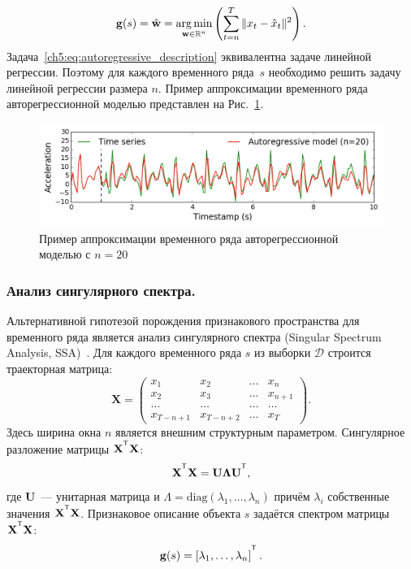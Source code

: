 \begin{equation}
\mathbf{g}(s) = \hat{\mathbf{w}} = \mathop{\arg \min}\limits_{\mathbf{w} \in \mathbb{R}^{n}} \left( \sum_{t=n}^{T} \|x_t - \hat{x}_t\|^2\right).
\label{ch5:eq:autoregressive_description}
\end{equation}
Задача~\eqref{ch5:eq:autoregressive_description} эквивалентна задаче линейной регрессии.
Поэтому для каждого временного ряда~$s$ необходимо решить задачу линейной регрессии размера $n$.
Пример аппроксимации временного ряда авторегрессионной моделью представлен на Рис.~\ref{ch5:fig:ar_example}.

\begin{figure}[ht]
	\centering
	\includegraphics[width=1\linewidth]{figs/ch5/ar_example.png}
	\caption{Пример аппроксимации временного ряда авторегрессионной моделью с $n = 20$}
	\label{ch5:fig:ar_example}
\end{figure}

\subsubsection{Анализ сингулярного спектра.}
Альтернативной гипотезой порождения признакового пространства для временного ряда является анализ сингулярного спектра (Singular Spectrum Analysis, SSA)~\cite{hassani2007singular}. 
Для каждого временного ряда $s$ из выборки $\mathcal{D}$ строится траекторная матрица:
\[
\mathbf{X} = 
\begin{pmatrix}
x_1 & x_2 & \dots & x_n \\
x_2 & x_3 & \dots & x_{n+1} \\
\dots & \dots & \dots & \dots \\
x_{T-n+1} & x_{T-n+2} & \dots & x_T
\end{pmatrix}.
\]
Здесь ширина окна $n$ является внешним структурным параметром.
Сингулярное разложение матрицы $\mathbf{X}^{\T} \mathbf{X}$:
\[
\mathbf{X}^{\T} \mathbf{X} = \mathbf{U} \mathbf{\Lambda} \mathbf{U}^{\T},
\]
где $\mathbf{U}$~--- унитарная матрица и $\Lambda = \mathrm{diag}(\lambda_1, \dots, \lambda_n)$ причём $\lambda_i$ собственные значения $\mathbf{X}^{\T} \mathbf{X}$. 
Признаковое описание объекта $s$ задаётся спектром матрицы $\mathbf{X}^{\T} \mathbf{X}$:
\[
\mathbf{g}(s) = \left[\lambda_1, \dots, \lambda_n\right]^{\T}.
\]
